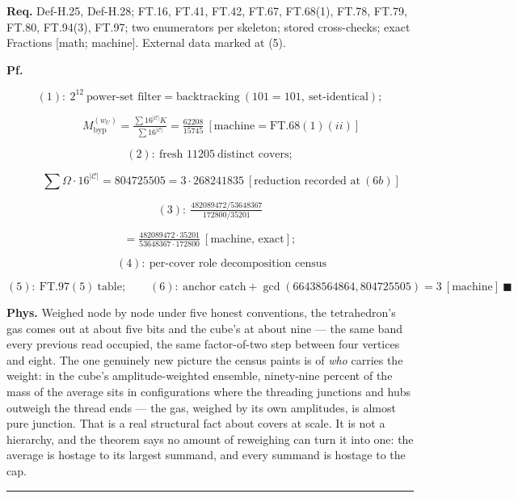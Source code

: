 \begin{theorem}
\textbf{Req.} Def-H.25, Def-H.28; FT.16, FT.41, FT.42, FT.67, FT.68(1), FT.78, FT.79, FT.80, FT.94(3), FT.97; two enumerators per skeleton; stored cross-checks; exact Fractions [math; machine]. External data marked at (5).

\textbf{Pf.}

\[
(1):\ 2^{12}\ \text{power-set filter}=\text{backtracking}\ (101=101,\ \text{set-identical});
\]

\[
\qquad M^{(w_U)}_{\mathrm{byp}}=\tfrac{\sum16^{|\mathcal C|}K}{\sum16^{|\mathcal C|}}=\tfrac{62208}{15745}\ [\text{machine}=\mathrm{FT.68}(1)(ii)]
\]

\[
(2):\ \text{fresh }11205\ \text{distinct covers};
\]

\[
\qquad \sum\Omega\cdot16^{|\mathcal C|}=804725505=3\cdot268241835\ [\text{reduction recorded at}\ (6b)]
\]

\[
(3):\ \tfrac{482089472/53648367}{172800/35201}
\]

\[
= \tfrac{482089472\cdot35201}{53648367\cdot172800}\ [\text{machine, exact}];
\]

\[
\qquad (4):\ \text{per-cover role decomposition census}
\]

\[
(5):\ \mathrm{FT.97}(5)\ \text{table};\qquad(6):\ \text{anchor catch}+\gcd(66438564864,804725505)=3\ [\text{machine}]\ \blacksquare
\]

\textbf{Phys.} Weighed node by node under five honest conventions, the tetrahedron's gas comes out at about five bits and the cube's at about nine — the same band every previous read occupied, the same factor-of-two step between four vertices and eight. The one genuinely new picture the census paints is of \textit{who} carries the weight: in the cube's amplitude-weighted ensemble, ninety-nine percent of the mass of the average sits in configurations where the threading junctions and hubs outweigh the thread ends — the gas, weighed by its own amplitudes, is almost pure junction. That is a real structural fact about covers at scale. It is not a hierarchy, and the theorem says no amount of reweighing can turn it into one: the average is hostage to its largest summand, and every summand is hostage to the cap.

\vspace{2pt}\noindent\rule{\textwidth}{0.4pt}\vspace{2pt}

\end{theorem}

